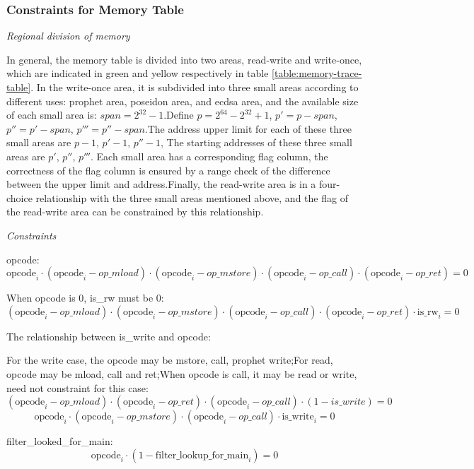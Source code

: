\subsubsection{Constraints for Memory Table} \label{sec:memory-constraints}

\emph{Regional division of memory}

In general, the memory table is divided into two areas, read-write and write-once, which are indicated in green and yellow respectively in table \ref{table:memory-trace-table}.
In the write-once area, it is subdivided into three small areas according to different uses: prophet area, poseidon area, and ecdsa area, and the available size of each small area is:
$span = 2^{32} - 1$.Define $p =2^{64} - 2^{32} + 1$, $p'=p-span$, $p''=p'-span$, $p'''=p''-span$.The address upper limit for each of these three small areas are $p-1$, $p'-1$, $p''-1$,
The starting addresses of these three small areas are $p'$, $p''$, $p'''$.
Each small area has a corresponding flag column, the correctness of the flag column is ensured by a
range check of the difference between the upper limit and address.Finally, the read-write area is in a four-choice relationship with the three small areas mentioned above, and the
flag of the read-write area can be constrained by this relationship.

\emph{Constraints}

opcode:
\[\mathrm{opcode}_i \cdot (\mathrm{opcode}_i - op\_mload) \cdot (\mathrm{opcode}_i-op\_mstore) \cdot (\mathrm{opcode}_i-op\_call) \cdot (\mathrm{opcode}_i-op\_ret)=0 \]

When opcode is 0, is\_rw must be 0:
\[ (\mathrm{opcode}_i-op\_mload) \cdot (\mathrm{opcode}_i-op\_mstore) \cdot (\mathrm{opcode}_i-op\_call) \cdot (\mathrm{opcode}_i-op\_ret) \cdot \mathrm{is\_rw}_i=0 \]

The relationship between is\_write and opcode:

For the write case, the opcode may be mstore, call, prophet write;For read, opcode may be mload, call and ret;When opcode is call, it may be read or write, need not constraint for this case:
\[ (\mathrm{opcode}_i-op\_mload) \cdot (\mathrm{opcode}_i - op\_ret) \cdot (\mathrm{opcode}_i - op\_call) \cdot (1-is\_write) = 0 \]
\[ \mathrm{opcode}_i \cdot (\mathrm{opcode}_i - op\_mstore) \cdot (\mathrm{opcode}_i - op\_call) \cdot \mathrm{is\_write}_i=0 \]

filter\_looked\_for\_main:
\[ \mathrm{opcode}_i \cdot (1-\mathrm{filter\_lookup\_for\_main}_i)=0 \]

